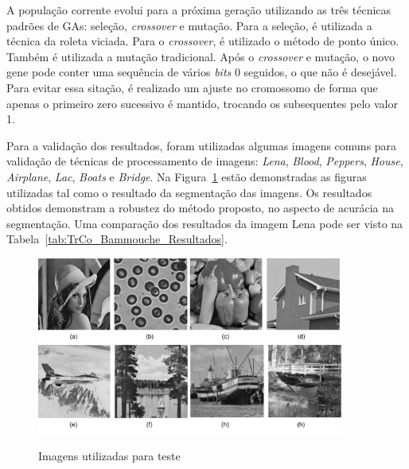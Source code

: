 \documentclass[12pt,oneside,a4paper,english,french,spanish,brazil,]{abntex2}
\begin{document}
A população corrente evolui para a próxima geração utilizando as três técnicas padrões de GAs: seleção, \textit{crossover} e mutação. Para a seleção, é utilizada a técnica da roleta viciada. Para o \textit{crossover}, é utilizado o método de ponto único. Também é utilizada a mutação tradicional. Após o \textit{crossover} e mutação, o novo gene pode conter uma sequência de vários \textit{bits} 0 seguidos, o que não é desejável. Para evitar essa sitação, é realizado um ajuste no cromossomo de forma que apenas o primeiro zero sucessivo é mantido, trocando os subsequentes pelo valor 1.

Para a validação dos resultados, foram utilizadas algumas imagens comuns para validação de técnicas de processamento de imagens: \textit{Lena}, \textit{Blood}, \textit{Peppers}, \textit{House}, \textit{Airplane}, \textit{Lac}, \textit{Boats} e \textit{Bridge}. Na Figura~\ref{fig:TrCo_Hammouche_1} estão demonstradas as figuras utilizadas tal como o resultado da segmentação das imagens. Os resultados obtidos demonstram a robustez do método proposto, no aspecto de acurácia na segmentação. Uma comparação dos resultados da imagem Lena pode ser visto na Tabela~\ref{tab:TrCo_Bammouche_Resultados}.

\begin{figure}[ht]
\centering
\caption{Imagens utilizadas para teste}
\includegraphics[width=0.9\textwidth]{imagens/TrCo_Hammouche_1.pdf}
\label{fig:TrCo_Hammouche_1}
\end{figure}
\end{document}
